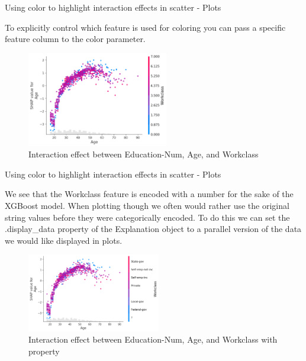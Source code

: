 \documentclass[aspectratio=169]{beamer}
\begin{document}
\begin{frame}{Using color to highlight interaction effects in scatter - Plots}

To explicitly control which feature is used for coloring you can pass a specific feature column to the color parameter.

    \begin{figure}[htbp]
        \centering
        \includegraphics[width=0.55\textwidth]{figs/shap/plots/scatter/example_notebooks_api_examples_plots_scatter_7_0.png}
        \caption{Interaction effect between Education-Num, Age, and Workclass}
        \label{fig:color-interaction-scatter}
    \end{figure}
\end{frame}

\begin{frame}{Using color to highlight interaction effects in scatter - Plots}

We see that the Workclass feature is encoded with a number for the sake of the XGBoost model. When plotting though we often would rather use the original string values before they were categorically encoded. To do this we can set the .display\_data property of the Explanation object to a parallel version of the data we would like displayed in plots.

    \begin{figure}[htbp]
        \centering
        \includegraphics[width=0.52\textwidth]{figs/shap/plots/scatter/example_notebooks_api_examples_plots_scatter_9_0.png}
        \caption{Interaction effect between Education-Num, Age, and Workclass with property}
        \label{fig:property-color-interaction-scatter}
    \end{figure}
\end{frame}
\end{document}
